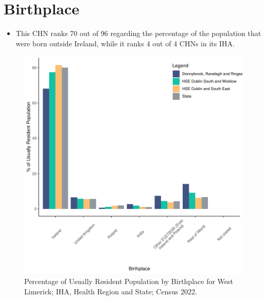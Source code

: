 \documentclass{article}
\begin{document}
\section{Birthplace}\label{sect:Birth}
\begin{itemize}
\item This CHN ranks  70 out of 96 regarding the percentage of the population that were born outside Ireland, while it ranks  4 out of 4 CHNs in its IHA.
\end{itemize}
\begin{figure}[H]
	\centering
	\includegraphics[width = 130mm]{../figures/BirthED.pdf}
	\caption{Percentage of Usually Resident Population by Birthplace for West Limerick; IHA, Health Region and State; Census 2022.}
	\label{fig:vbnv}
	\end{figure}
	
\end{document}

